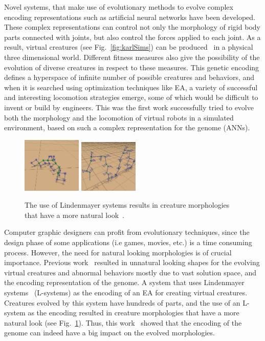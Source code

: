 Novel systems, that make use of evolutionary methods to evolve complex encoding representations such as artificial neural networks have been developed. These complex representations can control not only the morphology of rigid body parts connected with joints, but also control the forces applied to each joint. As a result, virtual creatures (see Fig.~\ref{fig:karlSims}) can be produced~\citep{sims1994evolving} in a physical three dimensional world. Different fitness measures also give the possibility of the evolution of diverse creatures in respect to these measures. This genetic encoding defines a hyperspace of infinite number of possible creatures and behaviors, and when it is searched using optimization techniques like EA, a variety of successful and interesting locomotion strategies emerge, some of which would be difficult to invent or build by engineers. This was the first work successfully tried to evolve both the morphology and the locomotion of virtual robots in a simulated environment, based on such a complex representation for the genome (ANNs).

\begin{figure}[t!]
\centering
\includegraphics[width=0.25\textwidth,height=0.2\textwidth]{../Figures/Misc/lsystems1.png}
\includegraphics[width=0.25\textwidth,height=0.2\textwidth]{../Figures/Misc/lsystems2.png}
\caption{The use of Lindenmayer systems results in creature morphologies that have a more natural look~\citep{hornby2001evolving}.}
\label{fig:lsystems}
\end{figure}

Computer graphic designers can profit from evolutionary techniques, since the design phase of some applications (i.e games, movies, etc.) is a time consuming process. However, the need for natural looking morphologies is of crucial importance. Previous work~\citep{lipson2000automatic,sims1994evolving} resulted in unnatural looking shapes for the evolving virtual creatures and abnormal behaviors mostly due to vast solution space, and the encoding representation of the genome. A system that uses Lindenmayer systems~\citep{hornby2001evolving} (L-systems) as the encoding of an EA for creating virtual creatures. Creatures evolved by this system have hundreds of parts, and the use of an L-system as the encoding resulted in creature morphologies that have a more natural look (see Fig.~\ref{fig:lsystems}). Thus, this work~\citep{hornby2001evolving} showed that the encoding of the genome can indeed have a big impact on the evolved morphologies.

